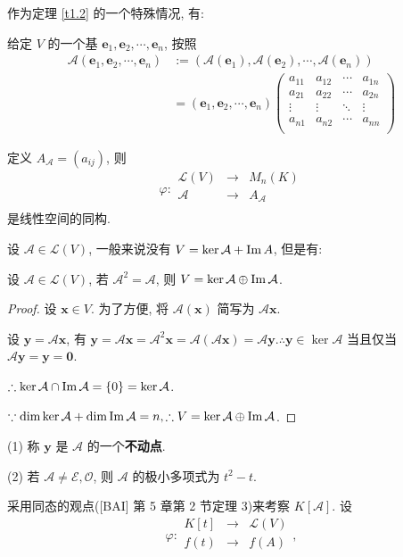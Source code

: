 \documentclass[color=black,device=normal,lang=cn,mode=geye]{elegantnote}
\begin{document}
作为定理 \ref{t1.2} 的一个特殊情况, 有:
\begin{theorem}\label{t2.1}
    给定 $V$ 的一个基 $\boldsymbol{e}_1,\boldsymbol{e}_2,\cdots,\boldsymbol{e}_n$, 按照
    \begin{align*}
        \mathcal{A}(\boldsymbol{e}_1,\boldsymbol{e}_2,\cdots,\boldsymbol{e}_n) & :=(\mathcal{A}(\boldsymbol{e}_1),\mathcal{A}(\boldsymbol{e}_2),\cdots,\mathcal{A}(\boldsymbol{e}_n)) \\
        & =(\boldsymbol{e}_1,\boldsymbol{e}_2,\cdots,\boldsymbol{e}_n)\begin{pmatrix}
            a_{11} & a_{12} & \cdots & a_{1n} \\
            a_{21} & a_{22} & \cdots & a_{2n} \\
            \vdots & \vdots & \ddots & \vdots \\
            a_{n1} & a_{n2} & \cdots & a_{nn} \\
        \end{pmatrix}
    \end{align*}

    定义 $A_\mathcal{A}=(a_{ij})$, 则
    \[\varphi:\begin{array}{rcl}
        \mathcal{L}(V) & \to & M_n(K) \\
        \mathcal{A} & \to & A_\mathcal{A} \\
    \end{array}\]
    是线性空间的同构.
\end{theorem}
设 $\mathcal{A}\in\mathcal{L}(V)$, 一般来说没有 $V=\ker\mathcal{A}+\operatorname{Im} A$, 但是有:
\begin{example}\label{exa2.1}
    设 $\mathcal{A}\in\mathcal{L}(V)$, 若 $\mathcal{A}^2=\mathcal{A}$, 则 $V=\ker\mathcal{A}\oplus\operatorname{Im} \mathcal{A}$.
\end{example}
\begin{proof}
    设 $\boldsymbol{x}\in V$. 为了方便, 将 $\mathcal{A}(\boldsymbol{x})$ 简写为 $\mathcal{A}\boldsymbol{x}$.

    设 $\boldsymbol{y}=\mathcal{A}\boldsymbol{x}$, 有 $\boldsymbol{y}=\mathcal{A}\boldsymbol{x}=\mathcal{A}^2\boldsymbol{x}=\mathcal{A}(\mathcal{A}\boldsymbol{x})=\mathcal{A}\boldsymbol{y}.\therefore\boldsymbol{y}\in\ker\mathcal{A}$ 当且仅当 $\mathcal{A}\boldsymbol{y}=\boldsymbol{y}=\boldsymbol{0}$.

    $\therefore\ker\mathcal{A}\cap\operatorname{Im} \mathcal{A}=\{0\}=\ker\mathcal{A}$.

    $\because\dim\ker\mathcal{A}+\dim\operatorname{Im} \mathcal{A}=n,\therefore V=\ker\mathcal{A}\oplus\operatorname{Im} \mathcal{A}$.
\end{proof}
\begin{note}
    (1) 称 $\boldsymbol{y}$ 是 $\mathcal{A}$ 的一个\textbf{不动点}.

    (2) 若 $\mathcal{A}\neq\mathcal{E},\mathcal{O}$, 则 $\mathcal{A}$ 的极小多项式为 $t^2-t$.
\end{note}
采用同态的观点([BAI] 第 5 章第 2 节定理 3)来考察 $K[\mathcal{A}]$. 设
\[\varphi:\begin{array}{rcl}
    K[t] & \to & \mathcal{L}(V) \\
    f(t) & \to & f(A) \\
\end{array},\]
\end{document}
